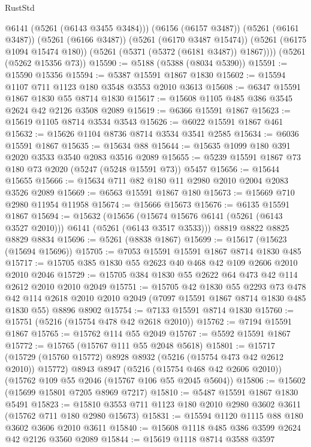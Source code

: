 \begin{lexlean}{RustStd}
\begin{coremodule}
          @6141
          (@5261 (@6143 @3455 @3484)))
        (@6156 (@6157 @3487))
        (@5261 (@6161 @3487))
        (@5261 (@6166 @3487))
        (@5261 (@6170 @3487 @15474))
        (@5261 (@6175 @1094 @15474 @180))
        (@5261 (@5371 (@5372 (@6181 @3487)) @1867))))
    (@5261 (@5262 @15356 @73))
@15590 := @5188 (@5388 (@8034 @5390))
@15591 := @15590 @15356
@15594 := @5387 @15591 @1867 @1830
@15602 := @15594 @1107 @711 @1123 @180 @3548 @3553 @2010 @3613
@15608 := @6347 @15591 @1867 @1830 @55 @8714 @1830
@15617 := @15608 @1105 @485 @386 @3545 @2624 @42 @2126 @3508 @2089
@15619 := @6366 @15591 @1867
@15623 := @15619 @1105 @8714 @3534 @3543
@15626 := @6022 @15591 @1867 @461
@15632 := @15626 @1104 @8736 @8714 @3534 @3541 @2585
@15634 := @6036 @15591 @1867
@15635 := @15634 @88
@15644 := @15635 @1099 @180 @391 @2020 @3533 @3540 @2083 @3516 @2089
@15655 := @5239 @15591 @1867 @73 @180 @73 @2020 (@5247 (@5248 @15591 @73)) @5457
@15656 := @15644 @15655
@15666 := @15634 @711 @82 @180 @11 @2980 @2010 @2004 @2083 @3526 @2089
@15669 := @6563 @15591 @1867 @180
@15673 := @15669 @710 @2980 @11954 @11958
@15674 := @15666 @15673
@15676 := @6135 @15591 @1867
@15694 := @15632
    (@15656 (@15674 @15676 @6141 (@5261 (@6143 @3527 @2010))) @6141 (@5261 (@6143 @3517 @3533)))
    @8819
    @8822
    @8825
    @8829
    @8834
@15696 := @5261 (@8838 @1867)
@15699 := @15617 (@15623 (@15694 @15696))
@15705 := @7053 @15591 @15591 @1867 @8714 @1830 @485
@15717 := @15705 @385 @1830 @55 @2623 @40 @468 @42 @109 @2606 @2010 @2010 @2046
@15729 := @15705 @384 @1830 @55 @2622 @64 @473 @42 @114 @2612 @2010 @2010 @2049
@15751 := @15705
    @42
    @1830
    @55
    @2293
    @73
    @478
    @42
    @114
    @2618
    @2010
    @2010
    @2049
    (@7097 @15591 @1867 @8714 @1830 @485 @1830 @55)
    @8896
    @8902
@15754 := @7133 @15591 @8714 @1830
@15760 := @15751 (@5216 (@15754 @478 @42 @2618 @2010))
@15762 := @7194 @15591 @1867
@15765 := @15762 @114 @55 @2049
@15767 := @5592 @15591 @1867
@15772 := @15765 (@15767 @111 @55 @2048 @5618)
@15801 := @15717
    (@15729 (@15760 @15772) @8928 @8932 (@5216 (@15754 @473 @42 @2612 @2010)) @15772)
    @8943
    @8947
    (@5216 (@15754 @468 @42 @2606 @2010))
    (@15762 @109 @55 @2046 (@15767 @106 @55 @2045 @5604))
@15806 := @15602 (@15699 @15801 @7205 @8969 @7217)
@15810 := @5487 @15591 @1867 @1830 @5491
@15823 := @15810 @3553 @711 @1123 @180 @2010 @2980 @3602 @3611 (@15762 @711 @180 @2980 @15673)
@15831 := @15594 @1120 @1115 @88 @180 @3602 @3606 @2010 @3611
@15840 := @15608 @1118 @485 @386 @3599 @2624 @42 @2126 @3560 @2089
@15844 := @15619 @1118 @8714 @3588 @3597

\end{coremodule}
\end{lexlean}
